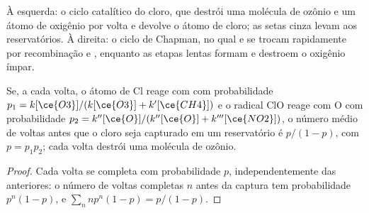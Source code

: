\begin{omfigure}

{\small À esquerda: o ciclo catalítico do cloro, que destrói uma molécula de ozônio
e um átomo de oxigênio por volta e devolve o átomo de cloro; as setas cinza levam
aos reservatórios. À direita: o ciclo de Chapman, no qual  e  se
trocam rapidamente por recombinação e , enquanto as etapas lentas formam e
destroem o oxigênio ímpar.}
\end{omfigure}

\begin{proposition}\label{prop:b3:photochemistry:catalytic-destruction}
Se, a cada volta, o átomo de Cl reage com  com probabilidade $p_1 =
k[\ce{O3}]/(k[\ce{O3}] + k'[\ce{CH4}])$ e o radical ClO reage com O com probabilidade $p_2 =
k''[\ce{O}]/(k''[\ce{O}] + k'''[\ce{NO2}])$, o número médio de voltas antes que o cloro seja
capturado em um reservatório é $p/(1 - p)$, com $p = p_1p_2$; cada volta destrói uma
molécula de ozônio.
\end{proposition}

\begin{proof}
Cada volta se completa com probabilidade $p$, independentemente das anteriores: o
número de voltas completas $n$ antes da captura tem probabilidade $p^n(1 -
p)$, e $\sum_nnp^n(1 - p) = p/(1 - p)$.
\end{proof}

